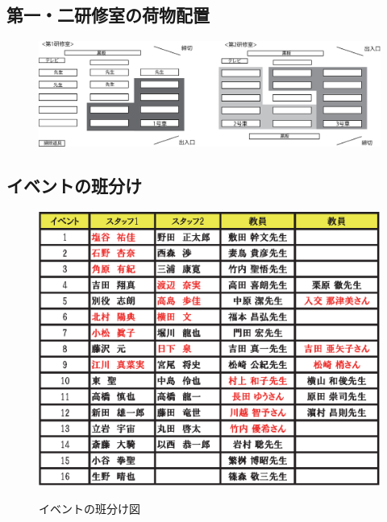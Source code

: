\subsection{第一・二研修室の荷物配置}
\begin{figure}[H]
\begin{center}
\includegraphics[scale=0.8]{./19/busnimotsu.eps}
\end{center}
\end{figure}

\vspace{-3mm}
\subsection{イベントの班分け}
\begin{figure}[H]
\begin{center}
\includegraphics[scale=0.8]{./19/event_hanwake.eps}
\label{fig:Eventhanwake}
\caption{イベントの班分け図}
\end{center}
\end{figure}



%
